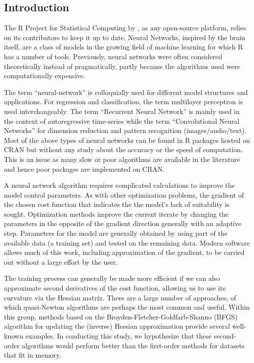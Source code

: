 \hypertarget{introduction}{%
\subsection{Introduction}\label{introduction}}

The \textsf{R} Project for Statistical Computing by \citep{Rsoft20}, as
any open-source platform, relies on its contributors to keep it up to
date. Neural Networks, inspired by the brain itself, are a class of
models in the growing field of machine learning for which \textsf{R} has
a number of tools. Previously, neural networks were often considered
theoretically instead of pragmatically, partly because the algorithms
used were computationally expensive.

The term ``neural-network'' is colloquially used for different model
structures and applications. For regression and classification, the term
multilayer perceptron is used interchangeably. The term ``Recurrent
Neural Network'' is mainly used in the context of autoregressive
time-series while the term ``Convolutional Neural Networks'' for
dimension reduction and pattern recognition (images/audio/text). Most of
the above types of neural networks can be found in R packages hosted on
CRAN but without any study about the accuracy or the speed of
computation. This is an issue as many slow or poor algorithms are
available in the literature and hence poor packages are implemented on
CRAN.

A neural network algorithm requires complicated calculations to improve
the model control parameters. As with other optimization problems, the
gradient of the chosen cost function that indicates the the model's lack
of suitability is sought. Optimization methods improve the current
iterate by changing the parameters in the opposite of the gradient
direction generally with an adaptive step. Parameters for the model are
generally obtained by using part of the available data (a training set)
and tested on the remaining data. Modern software allows much of this
work, including approximation of the gradient, to be carried out without
a large effort by the user.

The training process can generally be made more efficient if we can also
approximate second derivatives of the cost function, allowing us to use
its curvature via the Hessian matrix. There are a large number of
approaches, of which quasi-Newton algorithms are perhaps the most common
and useful. Within this group, methods based on the
Broyden-Fletcher-Goldfarb-Shanno (BFGS) algorithm for updating the
(inverse) Hessian approximation provide several well-known examples. In
conducting this study, we hypothesize that these second-order algorithms
would perform better than the first-order methods for datasets that fit
in memory.

